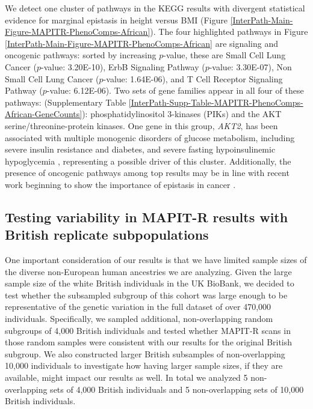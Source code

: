 \documentclass[12pt,a4paper]{article}
\begin{document}
We detect one cluster of pathways in the KEGG results  with divergent statistical evidence for marginal epistasis in height versus BMI (Figure \ref{InterPath-Main-Figure-MAPITR-PhenoComps-African}). The four highlighted pathways in Figure \ref{InterPath-Main-Figure-MAPITR-PhenoComps-African} are signaling and oncogenic pathways: sorted by increasing $p$-value, these are Small Cell Lung Cancer ($p$-value: 3.20E-10), ErbB Signaling Pathway ($p$-value: 3.30E-07), Non Small Cell Lung Cancer ($p$-value: 1.64E-06), and T Cell Receptor Signaling Pathway ($p$-value: 6.12E-06). Two sets of gene families appear in all four of these pathways: (Supplementary Table \ref{InterPath-Supp-Table-MAPITR-PhenoComps-African-GeneCounts}): phosphatidylinositol 3-kinases (PIKs) and the AKT serine/threonine-protein kinases. One gene in this group, \emph{AKT2}, has been associated with multiple monogenic disorders of glucose metabolism, including severe insulin resistance and diabetes, and severe fasting hypoinsulinemic hypoglycemia \citep{George2004,Manning2017,Latva-Rasku2018}, representing a possible driver of this cluster. Additionally, the presence of oncogenic pathways among top results may be in line with recent work beginning to show the importance of epistasis in cancer \citep{Wang2014,Jamshidi2015,Fang2019,Li2019,Ma2019}. 

\subsection{Testing variability in MAPIT-R results with British replicate subpopulations}

One important consideration of our results is that we have limited sample sizes of the diverse non-European human ancestries we are analyzing. Given the large sample size of the white British individuals in the UK BioBank, we decided to test whether the subsampled subgroup of this cohort was large enough to be representative of the genetic variation in the full dataset of over 470,000 individuals. Specifically, we sampled additional, non-overlapping random subgroups of 4,000 British individuals and tested whether MAPIT-R scans in those random samples were consistent with our results for the original British subgroup.  We also constructed larger British subsamples of non-overlapping 10,000 individuals to investigate how having larger sample sizes, if they are available, might impact our results as well. In total we analyzed 5 non-overlapping sets of 4,000 British individuals and 5 non-overlapping sets of 10,000 British individuals. 
\end{document}
